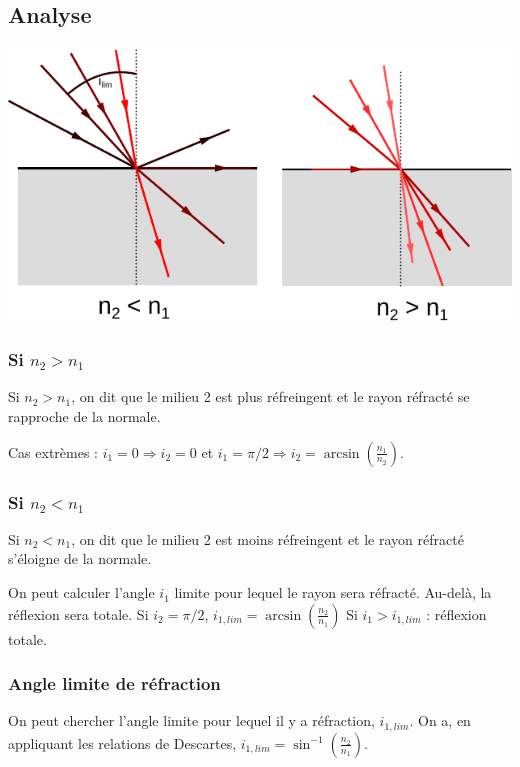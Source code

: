 \documentclass[french]{yLectureNote}
\begin{document}
	\subsection{Analyse}
	\includegraphics{fig2}
	\subsubsection{Si $n_2 > n_1$}
	Si $n_2 > n_1$, on dit que le milieu 2 est plus réfreingent et le rayon réfracté se rapproche de la normale.

	Cas extrèmes : $i_1 = 0 \Rightarrow i_2 = 0$ et $i_1 = \pi/2 \Rightarrow i_2 = \arcsin(\frac{n_1}{n_2})$.

	\subsubsection{Si $n_2 < n_1$}
	Si $n_2 < n_1$, on dit que le milieu 2 est moins réfreingent et le rayon réfracté s'éloigne de la normale.

	On peut calculer l'angle $i_1$ limite pour lequel le rayon sera réfracté. Au-delà, la réflexion sera totale.
	Si $i_2 = \pi/2$, $i_{1,lim} = \arcsin(\frac{n_2}{n_1})$ Si $i_1 > i_{1,lim}$ : réflexion totale.
\subsubsection{Angle limite de réfraction}
On peut chercher l'angle limite pour lequel il y a réfraction, $i_{1,lim}$. On a, en appliquant les relations de Descartes, $i_{1,lim} = \sin^{-1}(\frac{n_2}{n_1})$.
\end{document}
